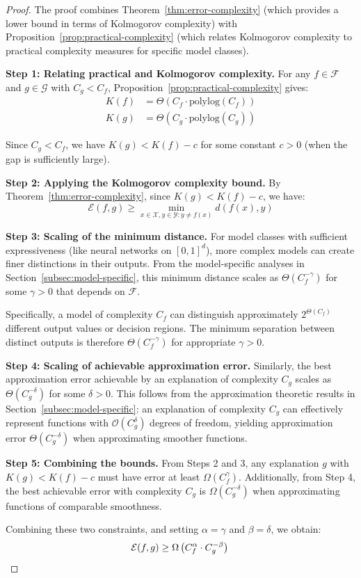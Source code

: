 \documentclass[11pt,letter,leqno]{article}
\begin{document}
\begin{proof}
The proof combines Theorem~\ref{thm:error-complexity} (which provides a lower bound in terms of 
Kolmogorov complexity) with Proposition~\ref{prop:practical-complexity} (which relates 
Kolmogorov complexity to practical complexity measures for specific model classes).

\textbf{Step 1: Relating practical and Kolmogorov complexity.}
For any $f \in \mathcal{F}$ and $g \in \mathcal{G}$ with $C_g < C_f$, 
Proposition~\ref{prop:practical-complexity} gives:
\begin{align}
K(f) &= \Theta(C_f \cdot \text{polylog}(C_f))\\
K(g) &= \Theta(C_g \cdot \text{polylog}(C_g))
\end{align}

Since $C_g < C_f$, we have $K(g) < K(f) - c$ for some constant $c > 0$ (when the gap is 
sufficiently large).

\textbf{Step 2: Applying the Kolmogorov complexity bound.}
By Theorem~\ref{thm:error-complexity}, since $K(g) < K(f) - c$, we have:
\begin{equation}
\mathcal{E}(f, g) \geq \min_{x \in \mathcal{X}, y \in \mathcal{Y}: y \neq f(x)} d(f(x), y)
\end{equation}

\textbf{Step 3: Scaling of the minimum distance.}
For model classes with sufficient expressiveness (like neural networks on $[0,1]^d$), more 
complex models can create finer distinctions in their outputs. From the model-specific analyses 
in Section~\ref{subsec:model-specific}, this minimum distance scales as 
$\Theta(C_f^{-\gamma})$ for some $\gamma > 0$ that depends on $\mathcal{F}$.

Specifically, a model of complexity $C_f$ can distinguish approximately $2^{\Theta(C_f)}$ 
different output values or decision regions. The minimum separation between distinct outputs 
is therefore $\Theta(C_f^{-\gamma})$ for appropriate $\gamma > 0$.

\textbf{Step 4: Scaling of achievable approximation error.}
Similarly, the best approximation error achievable by an explanation of complexity $C_g$ 
scales as $\Theta(C_g^{-\delta})$ for some $\delta > 0$. This follows from the approximation 
theoretic results in Section~\ref{subsec:model-specific}: an explanation of complexity $C_g$ 
can effectively represent functions with $\mathcal{O}(C_g^{\delta})$ degrees of freedom, 
yielding approximation error $\Theta(C_g^{-\delta})$ when approximating smoother functions.

\textbf{Step 5: Combining the bounds.}
From Steps 2 and 3, any explanation $g$ with $K(g) < K(f) - c$ must have error at least 
$\Omega(C_f^{\gamma})$. Additionally, from Step 4, the best achievable error with complexity 
$C_g$ is $\Omega(C_g^{-\delta})$ when approximating functions of comparable smoothness.

Combining these two constraints, and setting $\alpha = \gamma$ and $\beta = \delta$, we obtain:
\begin{equation}
\mathcal{E}(f, g) \geq \Omega\left(C_f^{\alpha} \cdot C_g^{-\beta}\right) \qedhere
\end{equation}
\end{proof}
\end{document}
